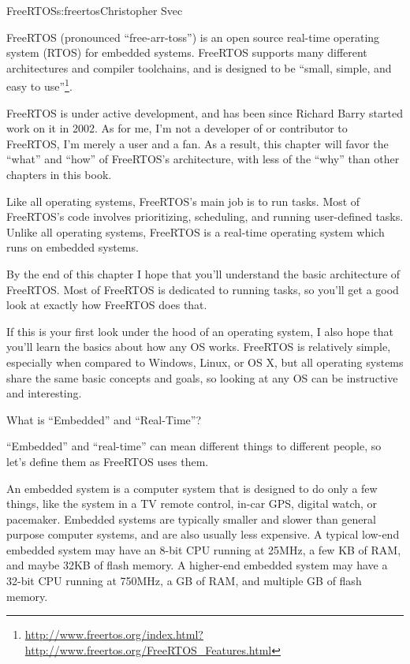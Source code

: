 \begin{aosachapter}{FreeRTOS}{s:freertos}{Christopher Svec}

FreeRTOS (pronounced ``free-arr-toss'') is an open source real-time
operating system (RTOS) for embedded systems. FreeRTOS supports many
different architectures and compiler toolchains, and is designed to be
``small, simple, and easy to
use''\footnote{\url{http://www.freertos.org/index.html?http://www.freertos.org/FreeRTOS_Features.html}}.

FreeRTOS is under active development, and has been since Richard Barry
started work on it in 2002.  As for me, I'm not a developer of or
contributor to FreeRTOS, I'm merely a user and a fan. As a result,
this chapter will favor the ``what'' and ``how'' of FreeRTOS's
architecture, with less of the ``why'' than other chapters in this
book.

Like all operating systems, FreeRTOS's main job is to run tasks. Most
of FreeRTOS's code involves prioritizing, scheduling, and running
user-defined tasks.  Unlike all operating systems, FreeRTOS is a
real-time operating system which runs on embedded systems.

By the end of this chapter I hope that you'll understand the basic
architecture of FreeRTOS. Most of FreeRTOS is dedicated to running
tasks, so you'll get a good look at exactly how FreeRTOS does that.

If this is your first look under the hood of an operating system, I
also hope that you'll learn the basics about how any OS
works. FreeRTOS is relatively simple, especially when compared to
Windows, Linux, or OS X, but all operating systems share the same basic
concepts and goals, so looking at any OS can be instructive
and interesting.

\begin{aosasect1}{What is ``Embedded'' and ``Real-Time''?}

``Embedded'' and ``real-time'' can mean different things to different
people, so let's define them as FreeRTOS uses them.

An embedded system is a computer system that is designed to do only a
few things, like the system in a TV remote control, in-car GPS, digital
watch, or pacemaker.  Embedded systems are typically smaller and
slower than general purpose computer systems, and are also usually
less expensive. A typical low-end embedded system may have an 8-bit
CPU running at 25MHz, a few KB of RAM, and maybe 32KB of flash memory.
A higher-end embedded system may have a 32-bit CPU running at 750MHz,
a GB of RAM, and multiple GB of flash memory.


\end{aosasect1}
\end{aosachapter}
